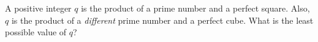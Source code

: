 A positive integer $q$ is the product of a prime number and a perfect square. Also, $q$ is the product of a \emph{different} prime number and a perfect cube. What is the least possible value of $q$?
